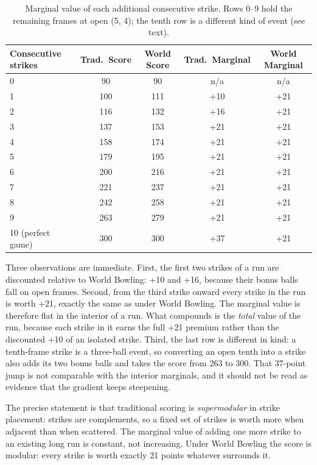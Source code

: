 \documentclass[USenglish]{article}
\theoremstyle{dgthm}
\theoremstyle{dgdef}
\begin{document}
\begin{table}[!ht]
\caption{Marginal value of each additional consecutive strike. Rows 0--9 hold the remaining frames at open (5, 4); the tenth row is a different kind of event (see text).}
\begin{tabular}{lcccc}
Consecutive strikes & Trad.\ Score & World Score & Trad.\ Marginal & World Marginal \\ \midrule
0 & 90 & 90 & n/a & n/a \\
1 & 100 & 111 & +10 & +21 \\
2 & 116 & 132 & +16 & +21 \\
3 & 137 & 153 & +21 & +21 \\
4 & 158 & 174 & +21 & +21 \\
5 & 179 & 195 & +21 & +21 \\
6 & 200 & 216 & +21 & +21 \\
7 & 221 & 237 & +21 & +21 \\
8 & 242 & 258 & +21 & +21 \\
9 & 263 & 279 & +21 & +21 \\
10 (perfect game) & 300 & 300 & +37 & +21 \\
\end{tabular}
\label{tab:gradient}
\end{table}

Three observations are immediate. First, the first two strikes of a run are discounted relative to World Bowling: +10 and +16, because their bonus balls fall on open frames. Second, from the third strike onward every strike in the run is worth +21, exactly the same as under World Bowling. The marginal value is therefore flat in the interior of a run. What compounds is the \emph{total} value of the run, because each strike in it earns the full +21 premium rather than the discounted +10 of an isolated strike. Third, the last row is different in kind: a tenth-frame strike is a three-ball event, so converting an open tenth into a strike also adds its two bonus balls and takes the score from 263 to 300. That 37-point jump is not comparable with the interior marginals, and it should not be read as evidence that the gradient keeps steepening.

The precise statement is that traditional scoring is \emph{supermodular} in strike placement: strikes are complements, so a fixed set of strikes is worth more when adjacent than when scattered. The marginal value of adding one more strike to an existing long run is constant, not increasing. Under World Bowling the score is modular: every strike is worth exactly 21 points whatever surrounds it.
\end{document}
